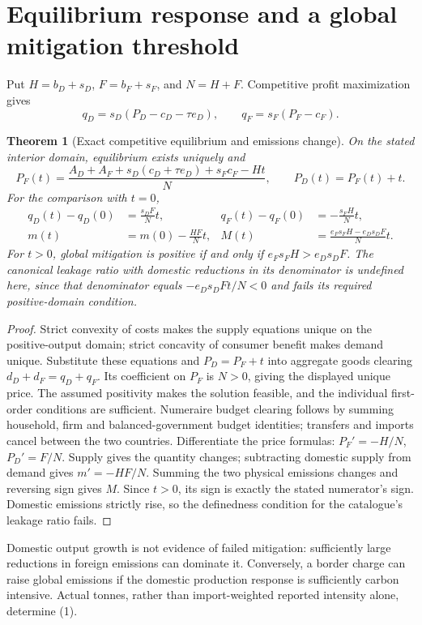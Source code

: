 \documentclass[11pt]{article}
\newtheorem{theorem}{Theorem}
\begin{document}
\section{Equilibrium response and a global mitigation threshold}
Put $H=b_D+s_D$, $F=b_F+s_F$, and $N=H+F$. Competitive profit
maximization gives
\[
 q_D=s_D(P_D-c_D-\tau e_D),\qquad q_F=s_F(P_F-c_F).
\]
\begin{theorem}[Exact competitive equilibrium and emissions change]
On the stated interior domain, equilibrium exists uniquely and
\[
 P_F(t)=\frac{A_D+A_F+s_D(c_D+\tau e_D)+s_Fc_F-Ht}{N},
 \qquad P_D(t)=P_F(t)+t.
\]
For the comparison with $t=0$,
\begin{align}
 q_D(t)-q_D(0)&=\frac{s_DF}{N}t,&
 q_F(t)-q_F(0)&=-\frac{s_FH}{N}t,\nonumber\\
 m(t)&=m(0)-\frac{HF}{N}t,&
 M(t)&=\frac{e_Fs_FH-e_Ds_DF}{N}t.                 \tag{1}
\end{align}
For $t>0$, global mitigation is positive if and only if
$e_Fs_FH>e_Ds_DF$. The canonical leakage ratio with domestic reductions
in its denominator is undefined here, since that denominator equals
$-e_Ds_DFt/N<0$ and fails its required positive-domain condition.
\end{theorem}
\begin{proof}
Strict convexity of costs makes the supply equations unique on the
positive-output domain; strict concavity of consumer benefit makes demand
unique. Substitute these equations and $P_D=P_F+t$ into aggregate goods
clearing $d_D+d_F=q_D+q_F$. Its coefficient on $P_F$ is $N>0$, giving
the displayed unique price. The assumed positivity makes the solution
feasible, and the individual first-order conditions are sufficient.
Numeraire budget clearing follows by summing household, firm and
balanced-government budget identities; transfers and imports cancel
between the two countries. Differentiate the price formulas:
$P_F'=-H/N$, $P_D'=F/N$. Supply gives the quantity changes; subtracting
domestic supply from demand gives $m'=-HF/N$. Summing the two physical
emissions changes and reversing sign gives $M$. Since $t>0$, its sign
is exactly the stated numerator's sign. Domestic emissions strictly rise,
so the definedness condition for the catalogue's leakage ratio fails.
\end{proof}

Domestic output growth is not evidence of failed mitigation: sufficiently
large reductions in foreign emissions can dominate it. Conversely, a
border charge can raise global emissions if the domestic production
response is sufficiently carbon intensive. Actual tonnes, rather than
import-weighted reported intensity alone, determine (1).
\end{document}
